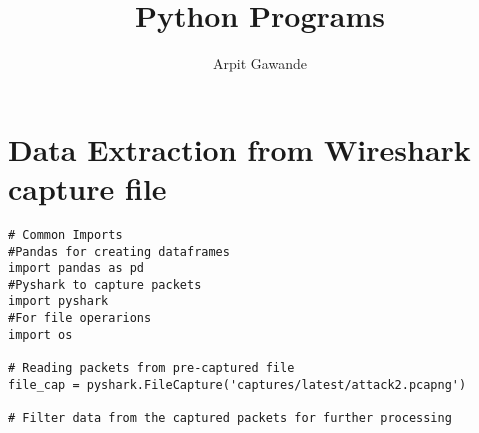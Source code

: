 \documentclass{report}
\begin{document}
\title{Python Programs}
\author{Arpit Gawande}
\maketitle
\section{Data Extraction from Wireshark capture file}
\begin{verbatim}
# Common Imports
#Pandas for creating dataframes
import pandas as pd
#Pyshark to capture packets
import pyshark
#For file operarions
import os

# Reading packets from pre-captured file
file_cap = pyshark.FileCapture('captures/latest/attack2.pcapng')

# Filter data from the captured packets for further processing


\end{verbatim}
\end{document}
